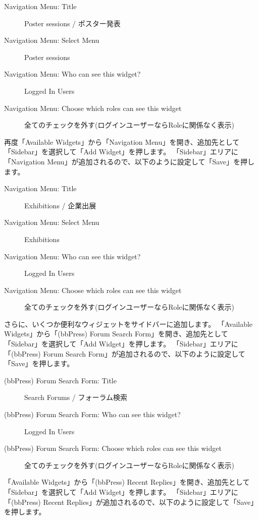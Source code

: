 \documentclass[titlepage,10pt,a4paper,uplatex]{jsbook}
\begin{document}
\begin{description}
\item[Navigation Menu: Title] Poster sessions / ポスター発表
\item[Navigation Menu: Select Menu] Poster sessions
\item[Navigation Menu: Who can see this widget?] Logged In Users
\item[Navigation Menu: Choose which roles can see this widget] 全てのチェックを外す(ログインユーザーならRoleに関係なく表示)
\end{description}

再度「Available Widgets」から「Navigation Menu」を開き、追加先として「Sidebar」を選択して「Add Widget」を押します。
「Sidebar」エリアに「Navigation Menu」が追加されるので、以下のように設定して「Save」を押します。

\begin{description}
\item[Navigation Menu: Title] Exhibitions / 企業出展
\item[Navigation Menu: Select Menu] Exhibitions
\item[Navigation Menu: Who can see this widget?] Logged In Users
\item[Navigation Menu: Choose which roles can see this widget] 全てのチェックを外す(ログインユーザーならRoleに関係なく表示)
\end{description}

さらに、いくつか便利なウィジェットをサイドバーに追加します。
「Available Widgets」から「(bbPress) Forum Search Form」を開き、追加先として「Sidebar」を選択して「Add Widget」を押します。
「Sidebar」エリアに「(bbPress) Forum Search Form」が追加されるので、以下のように設定して「Save」を押します。

\begin{description}
\item[(bbPress) Forum Search Form: Title] Search Forums / フォーラム検索
\item[(bbPress) Forum Search Form: Who can see this widget?] Logged In Users
\item[(bbPress) Forum Search Form: Choose which roles can see this widget] 全てのチェックを外す(ログインユーザーならRoleに関係なく表示)
\end{description}

「Available Widgets」から「(bbPress) Recent Replies」を開き、追加先として「Sidebar」を選択して「Add Widget」を押します。
「Sidebar」エリアに「(bbPress) Recent Replies」が追加されるので、以下のように設定して「Save」を押します。
\end{document}

